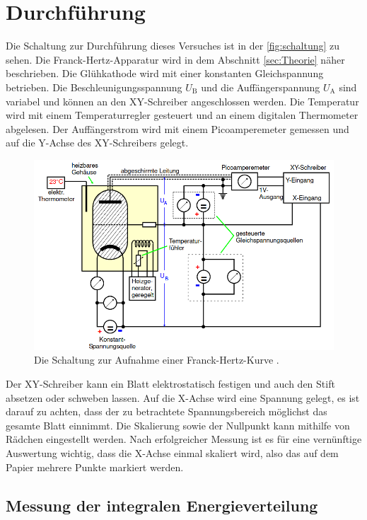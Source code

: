 \section{Durchführung}
\label{sec:Durchführung}

Die Schaltung zur Durchführung dieses Versuches ist in der \autoref{fig:schaltung} zu sehen. Die Franck-Hertz-Apparatur 
wird in dem Abschnitt \ref{sec:Theorie} näher beschrieben. Die Glühkathode wird mit einer konstanten Gleichspannung betrieben. 
Die Beschleunigungsspannung $U_{\text{B}}$ und die Auffängerspannung $U_{\text{A}}$ sind variabel und können an den XY-Schreiber 
angeschlossen werden. Die Temperatur wird mit einem Temperaturregler gesteuert und an einem digitalen Thermometer abgelesen. 
Der Auffängerstrom wird mit einem Picoamperemeter gemessen und auf die Y-Achse des XY-Schreibers gelegt. 

\begin{figure}[H]
    \centering
    \includegraphics[width=\textwidth]{bilder/schaltung.png}
    \caption{Die Schaltung zur Aufnahme einer Franck-Hertz-Kurve \cite{anleitung}.}
    \label{fig:schaltung}
\end{figure}

\noindent Der XY-Schreiber kann ein Blatt elektrostatisch festigen und auch den Stift absetzen oder schweben lassen. Auf die X-Achse wird
eine Spannung gelegt, es ist darauf zu achten, dass der zu betrachtete Spannungsbereich möglichst das gesamte Blatt einnimmt. 
Die Skalierung sowie der Nullpunkt kann mithilfe von Rädchen eingestellt werden. Nach erfolgreicher Messung ist es für eine vernünftige
Auswertung wichtig, dass die X-Achse einmal skaliert wird, also das auf dem Papier mehrere Punkte markiert werden.

\subsection{Messung der integralen Energieverteilung}

